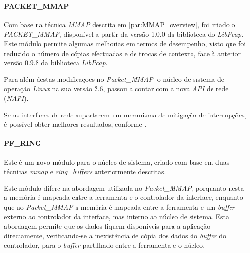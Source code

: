 \paragraph*{PACKET\_MMAP}

Com base na técnica \textit{MMAP} descrita em \ref{par:MMAP_overview}, foi criado o \textit{PACKET\_MMAP}, disponível a partir da versão 1.0.0 da biblioteca do \textit{LibPcap}.
Este módulo permite algumas melhorias em termos de desempenho, visto que foi reduzido o número de cópias efectuadas e de trocas de contexto, face à anterior versão 0.9.8 da biblioteca \textit{LibPcap}.

Para além destas modificações no \textit{Packet\_MMAP}, o núcleo de sistema de operação \textit{Linux} na sua versão 2.6, passou a contar com a nova \textit{API} de rede (\textit{NAPI}).

Se as interfaces de rede suportarem um mecanismo de mitigação de interrupções, é possível obter melhores resultados, conforme \cite{Deri2004}.

% 

\paragraph*{PF\_RING}

Este é um novo módulo para o núcleo de sistema, criado com base em duas técnicas \textit{mmap} e \textit{ring\_buffers} anteriormente descritas.

Este módulo difere na abordagem utilizada no \textit{Packet\_MMAP}, porquanto nesta a memória é mapeada entre a ferramenta e o controlador da interface, enquanto que no \textit{Packet\_MMAP} a memória é mapeada entre a ferramenta e um \textit{buffer} externo ao controlador da interface, mas interno ao núcleo de sistema.
Esta abordagem permite que os dados fiquem disponíveis para a aplicação directamente, verificando-se a inexistência de cópia dos dados do \textit{buffer} do controlador, para o \textit{buffer} partilhado entre a ferramenta e o núcleo\cite{:PF_RING}.
 
